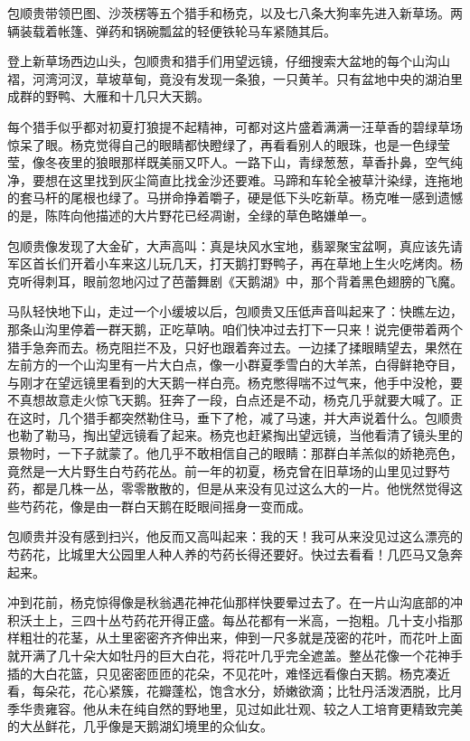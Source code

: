 \par 包顺贵带领巴图、沙茨楞等五个猎手和杨克，以及七八条大狗率先进入新草场。两辆装载着帐篷、弹药和锅碗瓢盆的轻便铁轮马车紧随其后。
\par 登上新草场西边山头，包顺贵和猎手们用望远镜，仔细搜索大盆地的每个山沟山褶，河湾河汊，草坡草甸，竟没有发现一条狼，一只黄羊。只有盆地中央的湖泊里成群的野鸭、大雁和十几只大天鹅。
\par 每个猎手似乎都对初夏打狼提不起精神，可都对这片盛着满满一汪草香的碧绿草场惊呆了眼。杨克觉得自己的眼睛都快瞪绿了，再看看别人的眼珠，也是一色绿莹莹，像冬夜里的狼眼那样既美丽又吓人。一路下山，青绿葱葱，草香扑鼻，空气纯净，要想在这里找到灰尘简直比找金沙还要难。马蹄和车轮全被草汁染绿，连拖地的套马杆的尾根也绿了。马拼命挣着嚼子，硬是低下头吃新草。杨克唯一感到遗憾的是，陈阵向他描述的大片野花已经凋谢，全绿的草色略嫌单一。
\par 包顺贵像发现了大金矿，大声高叫：真是块风水宝地，翡翠聚宝盆啊，真应该先请军区首长们开着小车来这儿玩几天，打天鹅打野鸭子，再在草地上生火吃烤肉。杨克听得刺耳，眼前忽地闪过了芭蕾舞剧《天鹅湖》中，那个背着黑色翅膀的飞魔。
\par 马队轻快地下山，走过一个小缓坡以后，包顺贵又压低声音叫起来了：快瞧左边，那条山沟里停着一群天鹅，正吃草呐。咱们快冲过去打下一只来！说完便带着两个猎手急奔而去。杨克阻拦不及，只好也跟着奔过去。一边揉了揉眼睛望去，果然在左前方的一个山沟里有一片大白点，像一小群夏季雪白的大羊羔，白得鲜艳夺目，与刚才在望远镜里看到的大天鹅一样白亮。杨克憋得喘不过气来，他手中没枪，要不真想故意走火惊飞天鹅。狂奔了一段，白点还是不动，杨克几乎就要大喊了。正在这时，几个猎手都突然勒住马，垂下了枪，减了马速，并大声说着什么。包顺贵也勒了勒马，掏出望远镜看了起来。杨克也赶紧掏出望远镜，当他看清了镜头里的景物时，一下子就蒙了。他几乎不敢相信自己的眼睛：那群白羊羔似的娇艳亮色，竟然是一大片野生白芍药花丛。前一年的初夏，杨克曾在旧草场的山里见过野芍药，都是几株一丛，零零散散的，但是从来没有见过这么大的一片。他恍然觉得这些芍药花，像是由一群白天鹅在眨眼间摇身一变而成。
\par 包顺贵并没有感到扫兴，他反而又高叫起来：我的天！我可从来没见过这么漂亮的芍药花，比城里大公园里人种人养的芍药长得还要好。快过去看看！几匹马又急奔起来。
\par 冲到花前，杨克惊得像是秋翁遇花神花仙那样快要晕过去了。在一片山沟底部的冲积沃土上，三四十丛芍药花开得正盛。每丛花都有一米高，一抱粗。几十支小指那样粗壮的花茎，从土里密密齐齐伸出来，伸到一尺多就是茂密的花叶，而花叶上面就开满了几十朵大如牡丹的巨大白花，将花叶几乎完全遮盖。整丛花像一个花神手插的大白花篮，只见密密匝匝的花朵，不见花叶，难怪远看像白天鹅。杨克凑近看，每朵花，花心紧簇，花瓣蓬松，饱含水分，娇嫩欲滴；比牡丹活泼洒脱，比月季华贵雍容。他从未在纯自然的野地里，见过如此壮观、较之人工培育更精致完美的大丛鲜花，几乎像是天鹅湖幻境里的众仙女。

